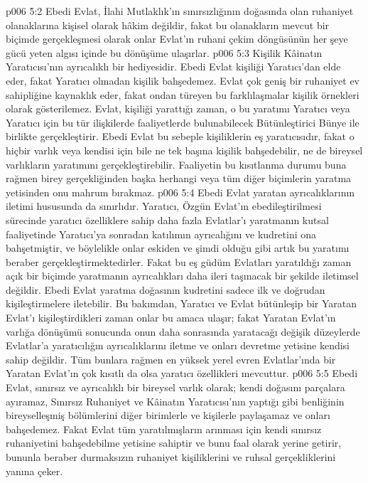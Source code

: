 \vs p006 5:2 Ebedi Evlat, İlahi Mutlaklık’ın sınırsızlığının doğasında olan ruhaniyet olanaklarına kişisel olarak hâkim değildir, fakat bu olanakların mevcut bir biçimde gerçekleşmesi olarak onlar Evlat’ın ruhani çekim döngüsünün her şeye gücü yeten algısı içinde bu dönüşüme ulaşırlar.
\vs p006 5:3 Kişilik Kâinatın Yaratıcısı’nın ayrıcalıklı bir hediyesidir. Ebedi Evlat kişiliği Yaratıcı’dan elde eder, fakat Yaratıcı olmadan kişilik bahşedemez. Evlat çok geniş bir ruhaniyet ev sahipliğine kaynaklık eder, fakat ondan türeyen bu farklılaşmalar kişilik örnekleri olarak gösterilemez. Evlat, kişiliği yarattığı zaman, o bu yaratımı Yaratıcı veya Yaratıcı için bu tür ilişkilerde faaliyetlerde bulunabilecek Bütünleştirici Bünye ile birlikte gerçekleştirir. Ebedi Evlat bu sebeple kişiliklerin eş yaratıcısıdır, fakat o hiçbir varlık veya kendisi için bile ne tek başına kişilik bahşedebilir, ne de bireysel varlıkların yaratımını gerçekleştirebilir. Faaliyetin bu kısıtlanma durumu buna rağmen birey gerçekliğinden başka herhangi veya tüm diğer biçimlerin yaratma yetisinden onu mahrum bırakmaz.
\vs p006 5:4 Ebedi Evlat yaratan ayrıcalıklarının iletimi hususunda da sınırlıdır. Yaratıcı, Özgün Evlat’ın ebedileştirilmesi sürecinde yaratıcı özelliklere sahip daha fazla Evlatlar’ı yaratmanın kutsal faaliyetinde Yaratıcı’ya sonradan katılımın ayrıcalığını ve kudretini ona bahşetmiştir, ve böylelikle onlar eskiden ve şimdi olduğu gibi artık bu yaratımı beraber gerçekleştirmektedirler. Fakat bu eş güdüm Evlatları yaratıldığı zaman açık bir biçimde yaratmanın ayrıcalıkları daha ileri taşınacak bir şekilde iletimsel değildir. Ebedi Evlat yaratma doğasının kudretini sadece ilk ve doğrudan kişileştirmelere iletebilir. Bu bakımdan, Yaratıcı ve Evlat bütünleşip bir Yaratan Evlat’ı kişileştirdikleri zaman onlar bu amaca ulaşır; fakat Yaratan Evlat’ın varlığa dönüşümü sonucunda onun daha sonrasında yaratacağı değişik düzeylerde Evlatlar’a yaratıcılığın ayrıcalıklarını iletme ve onları devretme yetisine kendisi sahip değildir. Tüm bunlara rağmen en yüksek yerel evren Evlatlar’ında bir Yaratan Evlat’ın çok kısıtlı da olsa yaratıcı özellikleri mevcuttur.
\vs p006 5:5 Ebedi Evlat, sınırsız ve ayrıcalıklı bir bireysel varlık olarak; kendi doğasını parçalara ayıramaz, Sınırsız Ruhaniyet ve Kâinatın Yaratıcısı’nın yaptığı gibi benliğinin bireyselleşmiş bölümlerini diğer birimlerle ve kişilerle paylaşamaz ve onları bahşedemez. Fakat Evlat tüm yaratılmışların arınması için kendi sınırsız ruhaniyetini bahşedebilme yetisine sahiptir ve bunu faal olarak yerine getirir, bununla beraber durmaksızın ruhaniyet kişiliklerini ve ruhsal gerçekliklerini yanına çeker.
